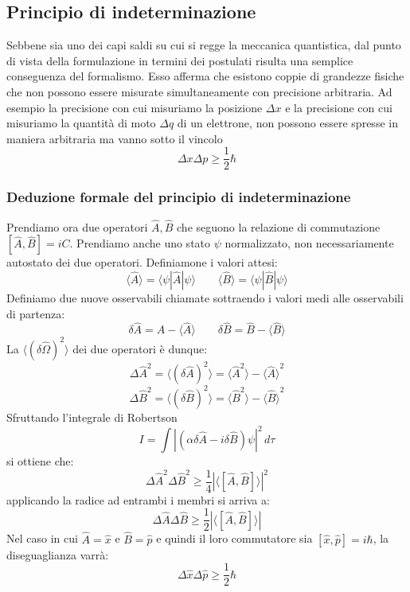 \subsection{Principio di indeterminazione}
Sebbene sia uno dei capi saldi su cui si regge la meccanica quantistica, dal punto di vista della formulazione in termini dei postulati risulta una semplice conseguenza del formalismo. Esso afferma che esistono coppie di grandezze fisiche che non possono essere misurate simultaneamente con precisione arbitraria. Ad esempio la precisione con cui misuriamo la posizione $\Delta x$ e la precisione con cui misuriamo la quantità di moto $\Delta q$ di un elettrone, non possono essere spresse in maniera arbitraria ma vanno sotto il vincolo
$$ \Delta x \Delta p \ge \frac{1}{2} \hbar$$

\subsubsection{Deduzione formale del principio di indeterminazione}
Prendiamo ora due operatori $\hat{A}, \hat{B}$ che seguono la relazione di commutazione $[\hat{A}, \hat{B}] = iC$. Prendiamo anche uno stato $\psi$ normalizzato, non necessariamente autostato dei due operatori. Definiamone i valori attesi:
$$\langle \hat{A} \rangle = \langle \psi | \hat{A} | \psi \rangle \qquad \langle \hat{B} \rangle = \langle \psi | \hat{B} | \psi \rangle$$
Definiamo due nuove osservabili chiamate  sottraendo i valori medi alle osservabili di partenza:
$$\delta \hat{A} = \hat{A} - \langle \hat{A} \rangle \qquad \delta \hat{B} = \hat{B} - \langle \hat{B} \rangle$$
La  $\langle (\delta\hat{\Omega})^2 \rangle$ dei due operatori è dunque:
$${\Delta \hat{A}}^2 = \langle (\delta \hat{A})^2 \rangle = \langle \hat{A}^2 \rangle - {\langle \hat{A} \rangle}^2 $$
$${\Delta \hat{B}}^2 = \langle (\delta \hat{B})^2 \rangle = \langle \hat{B}^2 \rangle - {\langle \hat{B} \rangle}^2$$
Sfruttando l'integrale di Robertson
$$ I = \int {|(\alpha \delta \hat{A} - i \delta \hat{B})\psi|}^2 \, d\tau$$
si ottiene che:
$$ {\Delta \hat{A}}^2 {\Delta \hat{B}}^2 \ge \frac{1}{4} {|\langle[\hat{A}, \hat{B}]\rangle|}^2$$
applicando la radice ad entrambi i membri si arriva a:
$$ \Delta \hat{A} \Delta \hat{B} \ge \frac{1}{2} |\langle[\hat{A}, \hat{B}]\rangle|$$
Nel caso in cui $\hat{A} = \hat{x}$ e $\hat{B} = \hat{p}$ e quindi il loro commutatore sia $[\hat{x}, \hat{p}] = i \hbar$, la diseguaglianza varrà:
$$ \Delta \hat{x} \Delta \hat{p} \ge \frac{1}{2} \hbar$$
